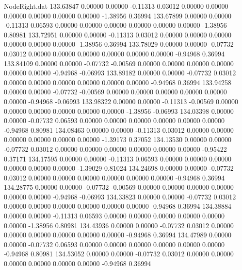 \begin{filecontents}{NodeRight.dat}
 133.63847    0.00000    0.00000    -0.11313    0.03012    0.00000    0.00000    0.00000    0.00000    0.00000    0.00000   -1.38956    0.36994
 133.67899    0.00000    0.00000    -0.11313    0.06593    0.00000    0.00000    0.00000    0.00000    0.00000    0.00000   -1.38956    0.80981
 133.72951    0.00000    0.00000    -0.11313    0.03012    0.00000    0.00000    0.00000    0.00000    0.00000    0.00000   -1.38956    0.36994
 133.78029    0.00000    0.00000    -0.07732    0.03012    0.00000    0.00000    0.00000    0.00000    0.00000    0.00000   -0.94968    0.36994
 133.84109    0.00000    0.00000    -0.07732   -0.00569    0.00000    0.00000    0.00000    0.00000    0.00000    0.00000   -0.94968   -0.06993
 133.89182    0.00000    0.00000    -0.07732    0.03012    0.00000    0.00000    0.00000    0.00000    0.00000    0.00000   -0.94968    0.36994
 133.94258    0.00000    0.00000    -0.07732   -0.00569    0.00000    0.00000    0.00000    0.00000    0.00000    0.00000   -0.94968   -0.06993
 133.98322    0.00000    0.00000    -0.11313   -0.00569    0.00000    0.00000    0.00000    0.00000    0.00000    0.00000   -1.38956   -0.06993
 134.03398    0.00000    0.00000    -0.07732    0.06593    0.00000    0.00000    0.00000    0.00000    0.00000    0.00000   -0.94968    0.80981
 134.08463    0.00000    0.00000    -0.11313    0.03012    0.00000    0.00000    0.00000    0.00000    0.00000    0.00000   -1.39173    0.37052
 134.13530    0.00000    0.00000    -0.07732    0.03012    0.00000    0.00000    0.00000    0.00000    0.00000    0.00000   -0.95422    0.37171
 134.17595    0.00000    0.00000    -0.11313    0.06593    0.00000    0.00000    0.00000    0.00000    0.00000    0.00000   -1.39029    0.81024
 134.24698    0.00000    0.00000    -0.07732    0.03012    0.00000    0.00000    0.00000    0.00000    0.00000    0.00000   -0.94968    0.36994
 134.28775    0.00000    0.00000    -0.07732   -0.00569    0.00000    0.00000    0.00000    0.00000    0.00000    0.00000   -0.94968   -0.06993
 134.33823    0.00000    0.00000    -0.07732    0.03012    0.00000    0.00000    0.00000    0.00000    0.00000    0.00000   -0.94968    0.36994
 134.38884    0.00000    0.00000    -0.11313    0.06593    0.00000    0.00000    0.00000    0.00000    0.00000    0.00000   -1.38956    0.80981
 134.43936    0.00000    0.00000    -0.07732    0.03012    0.00000    0.00000    0.00000    0.00000    0.00000    0.00000   -0.94968    0.36994
 134.47989    0.00000    0.00000    -0.07732    0.06593    0.00000    0.00000    0.00000    0.00000    0.00000    0.00000   -0.94968    0.80981
 134.53052    0.00000    0.00000    -0.07732    0.03012    0.00000    0.00000    0.00000    0.00000    0.00000    0.00000   -0.94968    0.36994

\end{filecontents}
